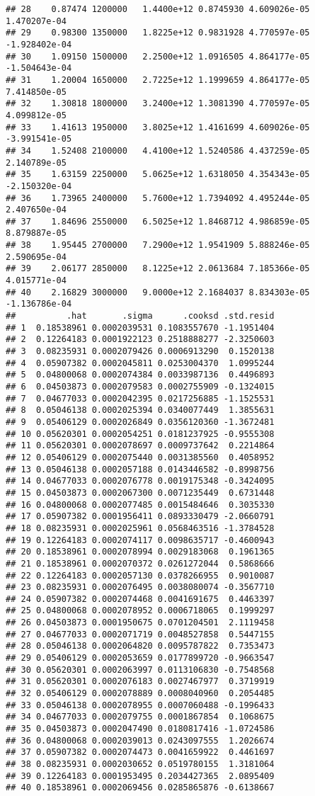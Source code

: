 \documentclass[]{book}
\theoremstyle{definition}
\theoremstyle{definition}
\theoremstyle{definition}
\theoremstyle{remark}
\begin{document}
\begin{verbatim}
## 28    0.87474 1200000   1.4400e+12 0.8745930 4.609026e-05  1.470207e-04
## 29    0.98300 1350000   1.8225e+12 0.9831928 4.770597e-05 -1.928402e-04
## 30    1.09150 1500000   2.2500e+12 1.0916505 4.864177e-05 -1.504643e-04
## 31    1.20004 1650000   2.7225e+12 1.1999659 4.864177e-05  7.414850e-05
## 32    1.30818 1800000   3.2400e+12 1.3081390 4.770597e-05  4.099812e-05
## 33    1.41613 1950000   3.8025e+12 1.4161699 4.609026e-05 -3.991541e-05
## 34    1.52408 2100000   4.4100e+12 1.5240586 4.437259e-05  2.140789e-05
## 35    1.63159 2250000   5.0625e+12 1.6318050 4.354343e-05 -2.150320e-04
## 36    1.73965 2400000   5.7600e+12 1.7394092 4.495244e-05  2.407650e-04
## 37    1.84696 2550000   6.5025e+12 1.8468712 4.986859e-05  8.879887e-05
## 38    1.95445 2700000   7.2900e+12 1.9541909 5.888246e-05  2.590695e-04
## 39    2.06177 2850000   8.1225e+12 2.0613684 7.185366e-05  4.015771e-04
## 40    2.16829 3000000   9.0000e+12 2.1684037 8.834303e-05 -1.136786e-04
##          .hat       .sigma      .cooksd .std.resid
## 1  0.18538961 0.0002039531 0.1083557670 -1.1951404
## 2  0.12264183 0.0001922123 0.2518888277 -2.3250603
## 3  0.08235931 0.0002079426 0.0006913290  0.1520138
## 4  0.05907382 0.0002045811 0.0253004370  1.0995244
## 5  0.04800068 0.0002074384 0.0033987136  0.4496893
## 6  0.04503873 0.0002079583 0.0002755909 -0.1324015
## 7  0.04677033 0.0002042395 0.0217256885 -1.1525531
## 8  0.05046138 0.0002025394 0.0340077449  1.3855631
## 9  0.05406129 0.0002026849 0.0356120360 -1.3672481
## 10 0.05620301 0.0002054251 0.0181237925 -0.9555308
## 11 0.05620301 0.0002078697 0.0009737642  0.2214864
## 12 0.05406129 0.0002075440 0.0031385560  0.4058952
## 13 0.05046138 0.0002057188 0.0143446582 -0.8998756
## 14 0.04677033 0.0002076778 0.0019175348 -0.3424095
## 15 0.04503873 0.0002067300 0.0071235449  0.6731448
## 16 0.04800068 0.0002077485 0.0015484646  0.3035330
## 17 0.05907382 0.0001956411 0.0893330479 -2.0660791
## 18 0.08235931 0.0002025961 0.0568463516 -1.3784528
## 19 0.12264183 0.0002074117 0.0098635717 -0.4600943
## 20 0.18538961 0.0002078994 0.0029183068  0.1961365
## 21 0.18538961 0.0002070372 0.0261272044  0.5868666
## 22 0.12264183 0.0002057130 0.0378266955  0.9010087
## 23 0.08235931 0.0002076495 0.0038080074 -0.3567710
## 24 0.05907382 0.0002074468 0.0041691675  0.4463397
## 25 0.04800068 0.0002078952 0.0006718065  0.1999297
## 26 0.04503873 0.0001950675 0.0701204501  2.1119458
## 27 0.04677033 0.0002071719 0.0048527858  0.5447155
## 28 0.05046138 0.0002064820 0.0095787822  0.7353473
## 29 0.05406129 0.0002053659 0.0177899720 -0.9663547
## 30 0.05620301 0.0002063997 0.0113106830 -0.7548568
## 31 0.05620301 0.0002076183 0.0027467977  0.3719919
## 32 0.05406129 0.0002078889 0.0008040960  0.2054485
## 33 0.05046138 0.0002078955 0.0007060488 -0.1996433
## 34 0.04677033 0.0002079755 0.0001867854  0.1068675
## 35 0.04503873 0.0002047490 0.0180817416 -1.0724586
## 36 0.04800068 0.0002039013 0.0243097555  1.2026674
## 37 0.05907382 0.0002074473 0.0041659922  0.4461697
## 38 0.08235931 0.0002030652 0.0519780155  1.3181064
## 39 0.12264183 0.0001953495 0.2034427365  2.0895409
## 40 0.18538961 0.0002069456 0.0285865876 -0.6138667
\end{verbatim}
\end{document}
